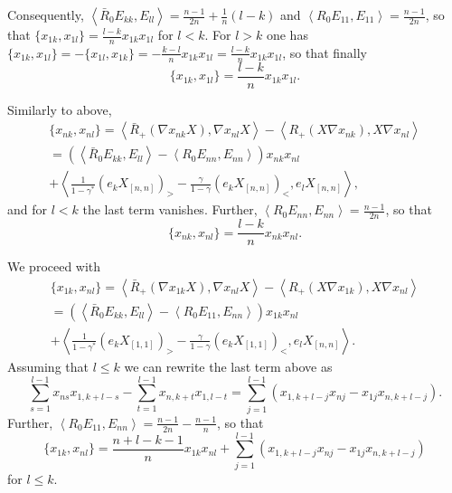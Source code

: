 \documentclass{amsart}
\theoremstyle{definition}
\theoremstyle{remark}
\numberwithin{equation}{section}
\numberwithin{theorem}{section}
\def\ls{\le}
\begin{document}
Consequently, $\left\langle\bar R_0 E_{kk},E_{ll}\right\rangle=\frac{n-1}{2n}+\frac1n(l-k)$ and 
$\left\langle R_0 E_{11},E_{11}\right\rangle=\frac{n-1}{2n}$, so that $\{x_{1k},x_{1l}\}=\frac{l-k}nx_{1k}x_{1l}$ for $l<k$. For $l>k$
one has $\{x_{1k},x_{1l}\}=-\{x_{1l},x_{1k}\}=-\frac{k-l}nx_{1k}x_{1l}=\frac{l-k}nx_{1k}x_{1l}$, so that finally
\begin{equation}\label{firstfirst}
 \{x_{1k},x_{1l}\}=\frac{l-k}nx_{1k}x_{1l}.
\end{equation}

Similarly to above,
\begin{multline*}
 \{x_{nk},x_{nl}\}=\left\langle \bar R_+(\nabla x_{nk}X),\nabla x_{nl}X\right\rangle-
\left\langle R_+(X\nabla x_{nk}),X\nabla x_{nl}\right\rangle\\=
\left(\left\langle\bar R_0 E_{kk},E_{ll}\right\rangle
-\left\langle R_0 E_{nn},E_{nn}\right\rangle\right) x_{nk}x_{nl}\\+
\left\langle \frac1{1-\gamma^*} (e_kX_{[n,n]})_>-\frac{\gamma}{1-\gamma}(e_kX_{[n,n]})_<,e_lX_{[n,n]}\right\rangle,
\end{multline*}
and for $l<k$ the last term vanishes. Further, $\left\langle R_0 E_{nn},E_{nn}\right\rangle=
\frac{n-1}{2n}$, so that 
\begin{equation}\label{lastlast}
 \{x_{nk},x_{nl}\}=\frac{l-k}nx_{nk}x_{nl}.
\end{equation}

We proceed with
\begin{multline*}
 \{x_{1k},x_{nl}\}=\left\langle \bar R_+(\nabla x_{1k}X),\nabla x_{nl}X\right\rangle-
\left\langle R_+(X\nabla x_{1k}),X\nabla x_{nl}\right\rangle\\=
\left(\left\langle\bar R_0 E_{kk},E_{ll}\right\rangle
-\left\langle R_0 E_{11},E_{nn}\right\rangle\right) x_{1k}x_{nl}\\+
\left\langle \frac1{1-\gamma^*} (e_kX_{[1,1]})_>-\frac{\gamma}{1-\gamma}(e_kX_{[1,1]})_<,e_lX_{[n,n]}\right\rangle.
\end{multline*}
Assuming that $l\ls k$ we can rewrite the last term above as
\[
\sum_{s=1}^{l-1} x_{ns}x_{1,k+l-s}-\sum_{t=1}^{l-1} x_{n,k+t}x_{1,l-t}=\sum_{j=1}^{l-1}
(x_{1,k+l-j}x_{nj}-x_{1j}x_{n,k+l-j}).
\]
Further,  $\left\langle R_0 E_{11},E_{nn}\right\rangle=\frac{n-1}{2n}-\frac{n-1}n$, so that 
\begin{equation}\label{first>last}
 \{x_{1k},x_{nl}\}=\frac{n+l-k-1}nx_{1k}x_{nl}+\sum_{j=1}^{l-1}(x_{1,k+l-j}x_{nj}-x_{1j}x_{n,k+l-j})
\end{equation}
for $l\le k$. 
\end{document}
